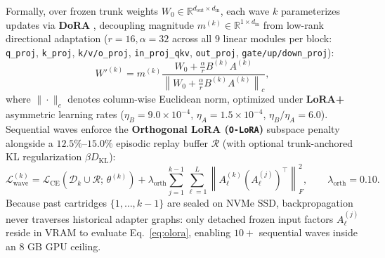 \documentclass[10pt,a4paper]{article}
\begin{document}
Formally, over frozen trunk weights $W_0 \in \mathbb{R}^{d_{\text{out}} \times d_{\text{in}}}$, each wave $k$ parameterizes updates via \textbf{DoRA} \cite{liu2024dora}, decoupling magnitude $m^{(k)} \in \mathbb{R}^{1 \times d_{\text{in}}}$ from low-rank directional adaptation ($r=16, \alpha=32$ across all $9$ linear modules per block: \texttt{q\_\allowbreak{}proj}, \texttt{k\_\allowbreak{}proj}, \texttt{k/v/o\_\allowbreak{}proj}, \texttt{in\_\allowbreak{}proj\_\allowbreak{}qkv}, \texttt{out\_\allowbreak{}proj}, \texttt{gate/up/down\_\allowbreak{}proj}):
\begin{equation}
  W'^{(k)} = m^{(k)} \frac{W_0 + \frac{\alpha}{r} B^{(k)} A^{(k)}}{\left\| W_0 + \frac{\alpha}{r} B^{(k)} A^{(k)} \right\|_c},
  \label{eq:dora}
\end{equation}
where $\|\cdot\|_c$ denotes column-wise Euclidean norm, optimized under \textbf{LoRA+} asymmetric learning rates \cite{hayou2024loraplus} ($\eta_B = 9.0 \times 10^{-4}$, $\eta_A = 1.5 \times 10^{-4}$, $\eta_B / \eta_A = 6.0$). Sequential waves enforce the \textbf{Orthogonal LoRA (\texttt{O-LoRA})} subspace penalty \cite{wang2023olora,liang2024inflora} alongside a $12.5\%\text{--}15.0\%$ episodic replay buffer $\mathcal{R}$ \cite{rolnick2019experience} (with optional trunk-anchored KL regularization $\beta D_{\text{KL}}$):
\begin{equation}
  \mathcal{L}_{\text{wave}}^{(k)} = \mathcal{L}_{\text{CE}}\!\left(\mathcal{D}_k \cup \mathcal{R};\, \theta^{(k)}\right) + \lambda_{\text{orth}} \sum_{j=1}^{k-1} \sum_{\ell=1}^{L} \left\| A_\ell^{(k)} \left(A_\ell^{(j)}\right)^{\!\top} \right\|_F^2, \qquad \lambda_{\text{orth}} = 0.10.
  \label{eq:olora}
\end{equation}
Because past cartridges $\{1,\dots,k-1\}$ are sealed on NVMe SSD, backpropagation never traverses historical adapter graphs: only detached frozen input factors $A_\ell^{(j)}$ reside in VRAM to evaluate Eq.~\ref{eq:olora}, enabling $10+$ sequential waves inside an $8\text{ GB}$ GPU ceiling.
\end{document}
